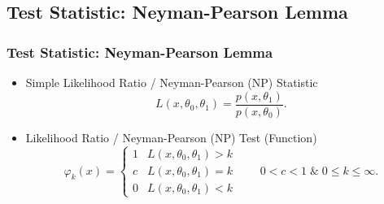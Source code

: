 \documentclass[serif,mathserif,professionalfont]{beamer}
\begin{document}
%	
%
%
%
%	
%	
%	



\subsection{Test Statistic: Neyman-Pearson Lemma}

\begin{frame}
	
	\frametitle{Test Statistic: Neyman-Pearson Lemma}
	
	\begin{itemize}
		\item Simple Likelihood Ratio / Neyman-Pearson (NP) Statistic
		\begin{equation*}
		L\left(x, \theta_0, \theta_1 \right) = \frac{p\left(x, \theta_1 \right)}{p\left(x, \theta_0 \right)}.
		\end{equation*}
		\item Likelihood Ratio / Neyman-Pearson (NP) Test (Function) 
		\begin{equation*}
		\varphi_k\left(x \right) = 
		\begin{cases}
		1 & L\left(x, \theta_0, \theta_1 \right) > k \\
		c & L\left(x, \theta_0, \theta_1 \right) = k \\
		0 & L\left(x, \theta_0, \theta_1 \right) < k
		\end{cases} \qquad
		0 < c < 1 \; \& \; 0 \leq k \leq \infty.
		\end{equation*}
	\end{itemize}
	
\end{frame}
\end{document}
